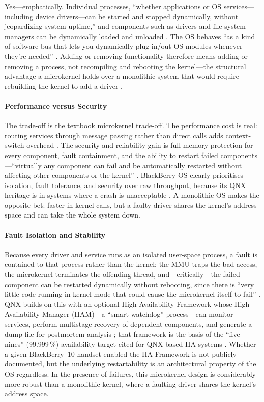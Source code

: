 Yes---emphatically. Individual processes, ``whether applications or OS
services---including device drivers---can be started and stopped
dynamically, without jeopardizing system uptime,'' and components such
as drivers and file-system managers can be dynamically loaded and
unloaded \citep{qnx_ham, qnx_neutrino_overview}. The OS behaves ``as a
kind of software bus that lets you dynamically plug in/out OS modules
whenever they're needed'' \citep{bb_microkernel_dev}. Adding or removing
functionality therefore means adding or removing a process, not
recompiling and rebooting the kernel---the structural advantage a
microkernel holds over a monolithic system that would require rebuilding
the kernel to add a driver \citep{qnx_neutrino_overview}.

\paragraph{Performance versus Security}

The trade-off is the textbook microkernel trade-off. The performance
cost is real: routing services through message passing rather than
direct calls adds context-switch overhead \citep{qnx_memman}. The
security and reliability gain is full memory protection for every
component, fault containment, and the ability to restart failed
components---``virtually any component can fail and be automatically
restarted without affecting other components or the kernel''
\citep{qnx_neutrino_overview}. BlackBerry OS clearly prioritises
isolation, fault tolerance, and security over raw throughput, because
its QNX heritage is in systems where a crash is unacceptable
\citep{qnx_ham, qnx_neutrino_overview}. A monolithic OS makes the
opposite bet: faster in-kernel calls, but a faulty driver shares the
kernel's address space and can take the whole system down.

\paragraph{Fault Isolation and Stability}

Because every driver and service runs as an isolated user-space process,
a fault is contained to that process rather than the kernel: the MMU
traps the bad access, the microkernel terminates the offending thread,
and---critically---the failed component can be restarted dynamically
without rebooting, since there is ``very little code running in kernel
mode that could cause the microkernel itself to fail'' \citep{qnx_ham}.
QNX builds on this with an optional High Availability Framework whose
High Availability Manager (HAM)---a ``smart watchdog'' process---can
monitor services, perform multistage recovery of dependent components,
and generate a dump file for postmortem analysis \citep{qnx_ham}; that
framework is the basis of the ``five nines'' (99.999\,\%) availability
target cited for QNX-based HA systems \citep{qnx_ham}. Whether a given
BlackBerry~10 handset enabled the HA Framework is not publicly
documented, but the underlying restartability is an architectural
property of the OS regardless. In the presence of failures, this
microkernel design is considerably more robust than a monolithic kernel,
where a faulting driver shares the kernel's address space.

